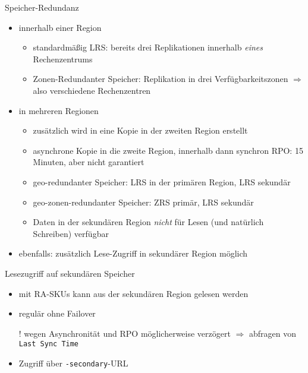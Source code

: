 \begin{flashcard}[]{Speicher-Redundanz}
  \begin{itemize}
    \item innerhalb einer Region
      \begin{itemize}
        \item standardmäßig LRS: bereits drei Replikationen innerhalb \emph{eines} Rechenzentrums
        \item Zonen-Redundanter Speicher: Replikation in drei Verfügbarkeitszonen\newline
          $\Rightarrow$ also verschiedene Rechenzentren
      \end{itemize}
    \item in mehreren Regionen
      \begin{itemize}
        \item zusätzlich wird in eine Kopie in der zweiten Region erstellt
        \item asynchrone Kopie in die zweite Region, innerhalb dann synchron\newline
          RPO: 15 Minuten, aber nicht garantiert
        \item geo-redundanter Speicher: LRS in der primären Region, LRS sekundär
        \item geo-zonen-redundanter Speicher: ZRS primär, LRS sekundär
        \item Daten in der sekundären Region \emph{nicht} für Lesen (und natürlich Schreiben) verfügbar
      \end{itemize}
    \item ebenfalls: zusätzlich Lese-Zugriff in sekundärer Region möglich
  \end{itemize}
\end{flashcard}

\begin{flashcard}[]{Lesezugriff auf sekundären Speicher}
  \begin{itemize}
    \item mit RA-SKUs kann aus der sekundären Region gelesen werden
    \item regulär ohne Failover
    \item[!] wegen Asynchronität und RPO möglicherweise verzögert\newline
      $\Rightarrow$ abfragen von \texttt{Last Sync Time}
    \item Zugriff über \texttt{-secondary}-URL
  \end{itemize}
\end{flashcard}

